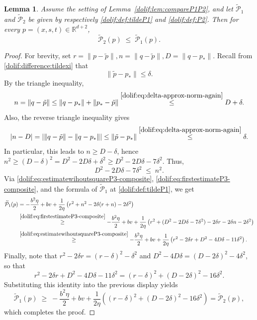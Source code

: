 \documentclass[11pt,letterpaper]{article}
\newtheorem{lemma}[thm]{Lemma}
\begin{document}
\begin{lemma}
\label{dolif:lem:compareP2P3}
Assume the setting of Lemma~\ref{dolif:lem:compareP1P2}, and let
\(\widetilde{\mathcal{P}}_1\) and \(\widetilde{\mathcal{P}}_2\) be given by respectively
\eqref{dolif:def:tildeP1} and \eqref{dolif:def:P2}.
Then for every \( p=(x,s,t)\in\mathbb{R}^{d+2}\),
\begin{equation}\label{dolif:ineq:P2-P3}
  \widetilde{\mathcal{P}}_2( p)\;\le\;\widetilde{\mathcal{P}}_1( p).
\end{equation}
\end{lemma}

\begin{proof}  
For brevity, set $ r = \| p-\tilde p\|, n = \| q-\tilde p\|, D = \| q- p_*\|.$ Recall from \eqref{dolif:difference:tildexi} that
\begin{equation}\label{dolif:eq:delta-approx-norm-again}
  \|\tilde p- p_*\|\le \delta.
\end{equation}
By the triangle inequality, 
\begin{equation}\label{dolif:eq:estimatewihoutsquareP3-composite}
  n=\| q-\tilde p\|
  \le \| q- p_*\|+\| p_*-\tilde p\|
  \stackrel{\eqref{dolif:eq:delta-approx-norm-again}}{\le} D+\delta.
\end{equation}
Also, the reverse triangle inequality gives \[|n-D|
  =\left|\| q-\tilde p\|-\| q- p_*\|\right|
  \le \|\tilde p- p_*\|
  \stackrel{\eqref{dolif:eq:delta-approx-norm-again}}{\le} \delta.\] 
In particular, this leads to \(n\ge D-\delta\), hence $ n^2 \ge (D-\delta)^2 = D^2 - 2D\delta + \delta^2 \ge D^2 - 2D\delta - 7\delta^2$. Thus, 
\begin{equation}\label{dolif:eq:firstestimateP3-composite}
  D^2 - 2D\delta - 7\delta^2 \;\le\; n^2.
\end{equation}
Via \eqref{dolif:eq:estimatewihoutsquareP3-composite}, \eqref{dolif:eq:firstestimateP3-composite},
and the formula of \(\widetilde{\mathcal{P}}_1\) at \eqref{dolif:def:tildeP1}, we get
\begin{align*}
  \widetilde{\mathcal{P}}_1( p)
  &= -\frac{b^2\eta}{2} + b v
     + \frac{1}{2\eta}\left(
        r^2 + n^2 - 2\delta(r+n) - 2\delta^2
     \right) \\
  &\stackrel{\eqref{dolif:eq:firstestimateP3-composite}}{\ge}
     -\frac{b^2\eta}{2} + b v
     + \frac{1}{2\eta}\left(
        r^2 + (D^2-2D\delta-7\delta^2) - 2\delta r - 2\delta n - 2\delta^2
     \right) \\
  &\stackrel{\eqref{dolif:eq:estimatewihoutsquareP3-composite}}{\ge}
     -\frac{b^2\eta}{2} + b v
     + \frac{1}{2\eta}\left(
        r^2 - 2\delta r + D^2 - 4D\delta - 11\delta^2
     \right).
\end{align*}
Finally, note that $r^2 - 2\delta r = (r-\delta)^2 - \delta^2$ and  $D^2 - 4D\delta = (D-2\delta)^2 - 4\delta^2$, so that
\[
  r^2 - 2\delta r + D^2 - 4D\delta - 11\delta^2
  = (r-\delta)^2 + (D-2\delta)^2 - 16\delta^2.
\]
Substituting this identity into the previous display yields
\[
  \widetilde{\mathcal{P}}_1( p)
  \;\ge\;
  -\frac{b^2\eta}{2} + b v
  + \frac{1}{2\eta}\left(
       (r-\delta)^2 + (D-2\delta)^2 - 16\delta^2
    \right)
  = \widetilde{\mathcal{P}}_2( p),
\]
which completes the proof.
\end{proof}
\end{document}
